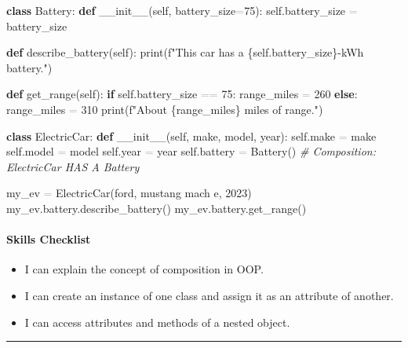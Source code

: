 \documentclass[
  justified,
  openright,
]{tufte-book}
\let\subsection\paragraph
\let\paragraph\paragraph
\newcommand{\KeywordTok}[1]{\textcolor{CodeKeyword}{\textbf{#1}}}  %
\newcommand{\StringTok}[1]{\textcolor{CodeString}{#1}}              %
\newcommand{\CommentTok}[1]{\textcolor{CodeComment}{\textit{#1}}}  %
\newcommand{\CodeNumTok}[1]{\textcolor{CodeNumber}{#1}}             %
\newcommand{\CodeFuncTok}[1]{\textcolor{CodeKeyword}{#1}}           %
\newcommand{\OperatorTok}[1]{\textcolor{DarkGray}{#1}}              %
\newenvironment{Shaded}{%
  \begin{mdframed}[style=TufteCode]%
}{%
  \end{mdframed}%
}
\let\subsection\paragraph
\let\paragraph\paragraph
\providecommand{\tightlist}{%
  \setlength{\itemsep}{0pt}\setlength{\parskip}{0pt}}
\begin{document}
\begin{Shaded}
\begin{Highlighting}[]
\KeywordTok{class} Battery:
    \KeywordTok{def} \CodeFuncTok{\_\_init\_\_}(self, battery\_size\OperatorTok{=}\CodeNumTok{75}):
        self.battery\_size \OperatorTok{=} battery\_size
 
    \KeywordTok{def} describe\_battery(self):
        print(\StringTok{f"This car has a }\StringTok{\{}self\StringTok{.}battery\_size\StringTok{\}}\StringTok{{-}kWh battery."})
 
    \KeywordTok{def} get\_range(self):
        \KeywordTok{if} self.battery\_size \OperatorTok{==} \CodeNumTok{75}:
            range\_miles \OperatorTok{=} \CodeNumTok{260}
        \KeywordTok{else}:
            range\_miles \OperatorTok{=} \CodeNumTok{310}
        print(\StringTok{f"About }\StringTok{\{}range\_miles\StringTok{\}}\StringTok{ miles of range."})
 
 
\KeywordTok{class} ElectricCar:
    \KeywordTok{def} \CodeFuncTok{\_\_init\_\_}(self, make, model, year):
        self.make \OperatorTok{=} make
        self.model \OperatorTok{=} model
        self.year \OperatorTok{=} year
        self.battery \OperatorTok{=} Battery()   \CommentTok{\# Composition: ElectricCar HAS A Battery}
 
 
my\_ev \OperatorTok{=} ElectricCar(\StringTok{\textquotesingle{}ford\textquotesingle{}}, \StringTok{\textquotesingle{}mustang mach e\textquotesingle{}}, \CodeNumTok{2023})
my\_ev.battery.describe\_battery()
my\_ev.battery.get\_range()
\end{Highlighting}
\end{Shaded}

\subsection{Skills Checklist}\label{skills-checklist-36}

\begin{itemize}
\tightlist
\item[$\square$]
  I can explain the concept of composition in OOP.
\item[$\square$]
  I can create an instance of one class and assign it as an attribute of
  another.
\item[$\square$]
  I can access attributes and methods of a nested object.
\end{itemize}

\begin{center}\rule{0.5\linewidth}{0.5pt}\end{center}
\end{document}
